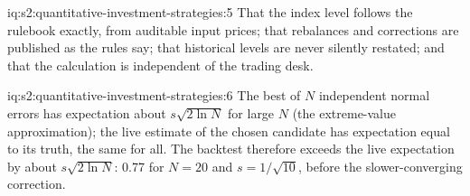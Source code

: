 \begin{solution}{iq:s2:quantitative-investment-strategies:5}
That the index level follows the rulebook exactly, from auditable input prices; that rebalances and corrections are published as the rules say;
that historical levels are never silently restated; and that the calculation is independent of the trading desk.
\end{solution}

\begin{solution}{iq:s2:quantitative-investment-strategies:6}
The best of $N$ independent normal errors has expectation about $s\sqrt{2\ln N}$ for large $N$ (the extreme-value approximation); the live estimate
of the chosen candidate has expectation equal to its truth, the same for all. The backtest therefore exceeds the live expectation by about
$s\sqrt{2\ln N}$: 0.77 for $N = 20$ and $s = 1/\sqrt{10}$, before the slower-converging correction.
\end{solution}
